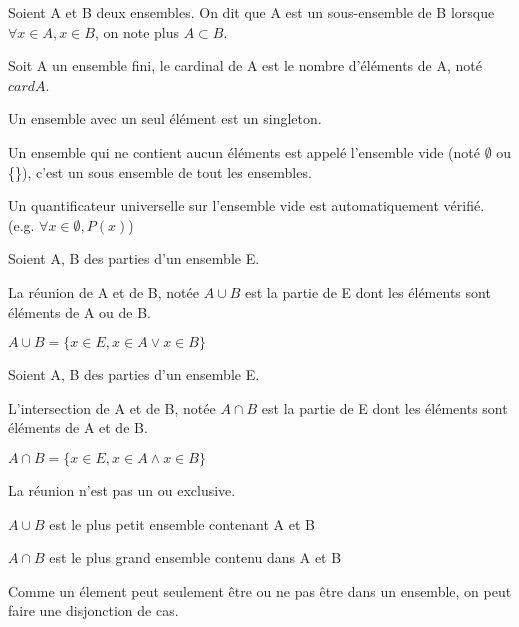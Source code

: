 \documentclass[a4paper, 12pt]{article}
\begin{document}
\begin{definition}
    Soient A et B deux ensembles. On dit que A est un sous-ensemble de B lorsque $\forall x \in A, x \in B$, on note plus $A \subset B$.

    Soit A un ensemble fini, le cardinal de A est le nombre d'éléments de A, noté $card A$.

    Un ensemble avec un seul élément est un singleton.

    Un ensemble qui ne contient aucun éléments est appelé l'ensemble vide (noté $\emptyset$ ou \{\}),
    c'est un sous ensemble de tout les ensembles.
\end{definition}

\begin{remark}
    Un quantificateur universelle sur l'ensemble vide est automatiquement vérifié.
    (e.g. $\forall x \in \emptyset, P(x)$)
\end{remark}

\begin{definition}
    Soient A, B des parties d'un ensemble E.

    La réunion de A et de B, notée $A \cup B$ est la partie de E dont les éléments sont éléments de A ou de B.

    $A \cup B = \{x \in E, x \in A \lor x \in B\}$
\end{definition}

\begin{definition}
    Soient A, B des parties d'un ensemble E.

    L'intersection de A et de B, notée $A \cap B$ est la partie de E dont les éléments sont éléments de A et de B.

    $A \cap B = \{x \in E, x \in A \land x \in B\}$
\end{definition}

\begin{remark}
    La réunion n'est pas un ou exclusive.
\end{remark}

\begin{remark}
    $A \cup B$ est le plus petit ensemble contenant A et B
\end{remark}

\begin{remark}
    $A \cap B$ est le plus grand ensemble contenu dans A et B
\end{remark}

\begin{remark}
    Comme un élement peut seulement être ou ne pas être dans un ensemble, on peut faire une disjonction de cas.
\end{remark}
\end{document}
